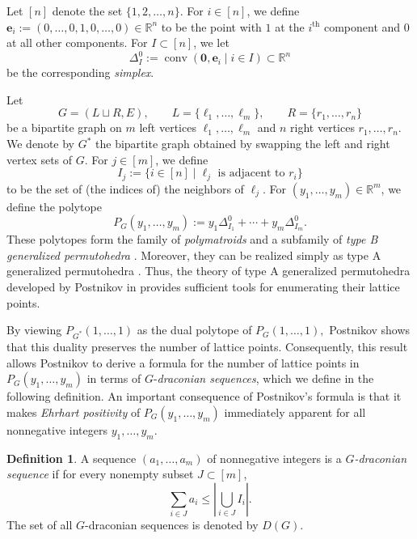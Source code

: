 \documentclass[11pt,a4paper]{article}
\newcommand{\vct}[1]{\boldsymbol{#1}}
\newcommand{\R}{\mathbb{R}}
\newcommand{\conv}{\operatorname{conv}}
\newcommand{\1}{\mathbf{1}}
\theoremstyle{plain}
\theoremstyle{definition}
\newtheorem{definition}[theorem]{Definition}
\begin{document}
Let $[n]$ denote the set $\{1,2,\ldots,n\}$. For $i\in[n]$, we define
$\vct{e}_i:=(0,\ldots,0,1,0,\ldots,0)\in\R^n$ to be the point with $1$ at the $i^{\mathrm{th}}$ component and $0$ at all other components. For $I\subset[n]$, we let
\[
\Delta_I^0:=\conv(\vct{0},\vct{e}_i\mid i\in I)\subset\R^n
\]
be the corresponding \textit{simplex}.

Let
\[
G=(L\sqcup R,E),\qquad
L=\{\ell_1,\ldots,\ell_m\},\qquad
R=\{r_1,\ldots,r_n\}
\]
be a bipartite graph on $m$ left vertices $\ell_1, \dots, \ell_m$ and $n$ right vertices $r_1, \dots, r_n$. We denote by $G^*$ the bipartite graph obtained by swapping the left and right vertex sets of $G$. For $j\in[m]$, we define
\begin{equation}
I_j:=\{i\in[n]\mid \ell_j\text{ is adjacent to }r_i\}
\label{eq:Ij}
\end{equation}
to be the set of (the indices of) the neighbors of $\ell_j.$ For $(y_1,\ldots,y_m)\in\R^m$, we define the polytope
\begin{equation}
P_G(y_1,\ldots,y_m):=y_1\Delta_{I_1}^0+\cdots+y_m\Delta_{I_m}^0.
\label{eq:PG}
\end{equation}
These polytopes form the family of \emph{polymatroids} \cite{edmonds2003submodular,fujishige2005submodular} and a subfamily of \emph{type B generalized permutohedra} \cite{Bastidas2021,Euretall2024}. Moreover, they can be realized simply as type A generalized permutohedra \cite{thawinrak2025AtoB}. Thus, the theory of type A generalized permutohedra developed by Postnikov in \cite{Postnikov2009} provides sufficient tools for enumerating their lattice points. 

By viewing $P_{G^*}(1,\dots,1)$ as the dual polytope of $P_{G}(1,\dots, 1),$ Postnikov shows that this duality preserves the number of lattice points. Consequently, this result allows Postnikov to derive a formula for the number of lattice points in $P_G(y_1,\dots, y_m)$ in terms of $G$-\emph{draconian sequences}, which we define in the following definition. An important consequence of Postnikov’s formula is that it makes \textit{Ehrhart positivity} of $P_G(y_1,\dots,y_m)$ immediately apparent for all nonnegative integers $y_1,\dots,y_m$.

\begin{definition}\label{def: draconion-sequence}
A sequence $(a_1,\ldots,a_m)$ of nonnegative integers is a \emph{$G$-draconian sequence} if for every nonempty subset $J\subset[m]$,
\[
\sum_{i\in J}a_i\le \left|\bigcup_{i\in J}I_i\right|.
\]
The set of all $G$-draconian sequences is denoted by $D(G)$.
\end{definition}
\end{document}
